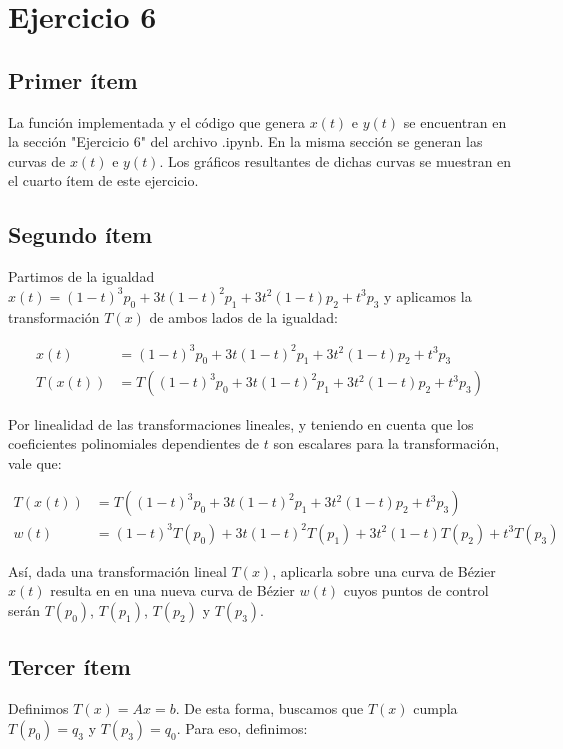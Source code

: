 \documentclass{article}
\begin{document}
\section*{Ejercicio 6}
\subsection*{Primer ítem}
La función implementada y el código que genera $x(t)$ e $y(t)$ se encuentran en la sección "Ejercicio 6" del archivo .ipynb. En la misma sección se generan las curvas de $x(t)$ e $y(t)$. Los gráficos resultantes de dichas curvas se muestran en el cuarto ítem de este ejercicio.

\subsection*{Segundo ítem}
Partimos de la igualdad $x(t) = (1 - t)^3 p_0 + 3t(1 - t)^2 p_1 + 3t^2(1 - t) p_2 + t^3 p_3$ y aplicamos la transformación $T(x)$ de ambos lados de la igualdad:

$$
\begin{aligned}
x(t) &= (1 - t)^3 p_0 + 3t(1 - t)^2 p_1 + 3t^2(1 - t) p_2 + t^3 p_3 \\
T(x(t)) &= T((1 - t)^3 p_0 + 3t(1 - t)^2 p_1 + 3t^2(1 - t) p_2 + t^3 p_3)
\end{aligned}
$$

Por linealidad de las transformaciones lineales, y teniendo en cuenta que los coeficientes polinomiales dependientes de $t$ son escalares para la transformación, vale que:

$$
\begin{aligned}
T(x(t)) &= T((1 - t)^3 p_0 + 3t(1 - t)^2 p_1 + 3t^2(1 - t) p_2 + t^3 p_3) \\
w(t) &= (1 - t)^3 T(p_0) + 3t(1 - t)^2 T(p_1) + 3t^2(1 - t) T(p_2) + t^3 T(p_3)
\end{aligned}
$$

Así, dada una transformación lineal $T(x)$, aplicarla sobre una curva de Bézier $x(t)$ resulta en en una nueva curva de Bézier $w(t)$ cuyos puntos de control serán  $T(p_0)$,  $T(p_1)$,  $T(p_2)$ y  $T(p_3)$.

\subsection*{Tercer ítem}
Definimos $T(x) = Ax = b$. De esta forma, buscamos que $T(x)$ cumpla $T(p_0) = q_3$ y $T(p_3) = q_0$. 
Para eso, definimos: 
\end{document}
